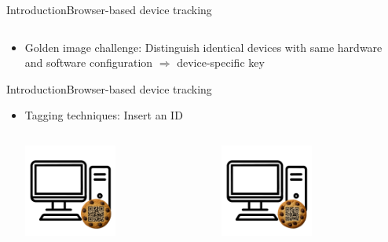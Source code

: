 \documentclass[aspectratio=169, hyperref={colorlinks=true, allcolors=SecondaryColor}, c]{beamer}
\begin{document}
\begin{frame}[fragile]{Introduction}{Browser-based device tracking}
\begin{columns}
\begin{column}{0.33\textwidth}
		\end{column}
	\end{columns}
	\vspace{-0.5cm}
	\begin{itemize}
		\item \alert{Golden image challenge:} Distinguish identical devices with same hardware and software configuration \checkboxUnchecked \alert{$\Rightarrow$ device-specific key}
	\end{itemize}
\end{frame}

\begin{frame}[fragile]{Introduction}{Browser-based device tracking}
	\begin{itemize}
		\item \alert{Tagging techniques:} Insert an ID
		\begin{columns}
			\begin{column}{0.33\textwidth}
				\includegraphics[width=0.5\textwidth, center]{./figures/computer_alpha_cookie_1.png}
			\end{column}
			\begin{column}{0.33\textwidth}
				\includegraphics[width=0.5\textwidth, center]{./figures/computer_alpha_cookie_2.png}
			\end{column}

\end{columns}
\end{itemize}
\end{frame}
\end{document}
